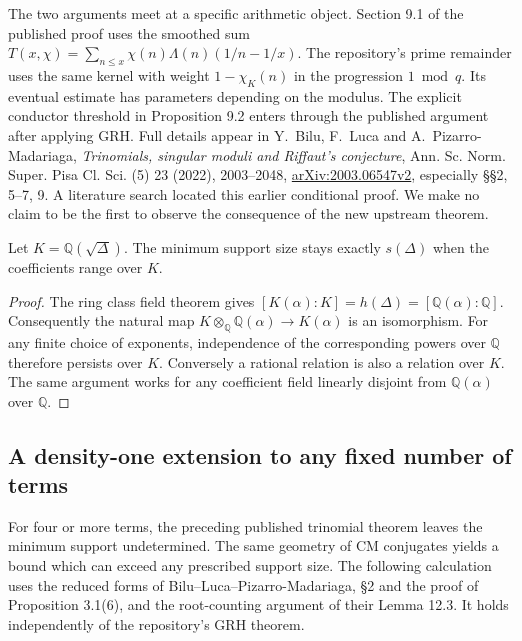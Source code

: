 The two arguments meet at a specific arithmetic object. Section 9.1 of
the published proof uses the smoothed sum
$T(x,\chi)=\sum_{n\le x}\chi(n)\Lambda(n)(1/n-1/x)$.
The repository's prime remainder uses the same kernel with weight
$1-\chi_K(n)$ in the progression $1\bmod q$. Its eventual estimate has
parameters depending on the modulus. The explicit conductor threshold in
Proposition 9.2 enters through the published argument after applying GRH.
Full details appear in Y.~Bilu, F.~Luca and A.~Pizarro-Madariaga,
\emph{Trinomials, singular moduli and Riffaut's conjecture},
Ann. Sc. Norm. Super. Pisa Cl. Sci. (5) 23 (2022), 2003--2048,
\href{https://arxiv.org/pdf/2003.06547}{arXiv:2003.06547v2},
especially \S\S2, 5--7, 9.
A literature search located this earlier conditional proof. We make no claim
to be the first to observe the consequence of the new upstream theorem.

\begin{corollary}
Let $K=\mathbb Q(\sqrt\Delta)$. The minimum support size stays exactly
$s(\Delta)$ when the coefficients range over $K$.
\end{corollary}
\begin{proof}
The ring class field theorem gives
$[K(\alpha):K]=h(\Delta)=[\mathbb Q(\alpha):\mathbb Q]$.
Consequently the natural map
$K\otimes_{\mathbb Q}\mathbb Q(\alpha)\to K(\alpha)$ is an isomorphism.
For any finite choice of exponents, independence of the corresponding powers
over $\mathbb Q$ therefore persists over $K$. Conversely a rational relation
is also a relation over $K$. The same argument works for any coefficient
field linearly disjoint from $\mathbb Q(\alpha)$ over $\mathbb Q$.
\end{proof}

\subsection{A density-one extension to any fixed number of terms}

For four or more terms, the preceding published trinomial theorem leaves the
minimum support undetermined. The same geometry of CM conjugates yields a bound
which can exceed any prescribed support size. The following calculation
uses the reduced forms of Bilu--Luca--Pizarro-Madariaga, \S2 and the proof
of Proposition 3.1(6), and the root-counting argument of their Lemma 12.3.
It holds independently of the repository's GRH theorem.


